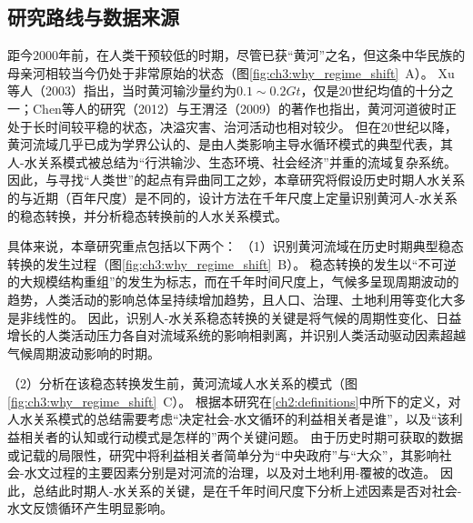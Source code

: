 \subsection{研究路线与数据来源}\label{sec:ch3:method}


距今$2000$年前，在人类干预较低的时期，尽管已获“黄河”之名，但这条中华民族的母亲河相较当今仍处于非常原始的状态（图\ref{fig:ch3:why_regime_shift}~A）。
Xu等人（2003）\cite{xu2003a}指出，当时黄河输沙量约为$0.1\sim0.2 Gt$，仅是20世纪均值的十分之一；Chen等人的研究（2012）\cite{chen2012}与王渭泾（2009）\cite{WangWeiJing2009}的著作也指出，黄河河道彼时正处于长时间较平稳的状态，决溢灾害、治河活动也相对较少。
但在20世纪以降，黄河流域几乎已成为学界公认的、是由人类影响主导水循环模式的典型代表，其人-水关系模式被总结为“行洪输沙、生态环境、社会经济”并重的流域复杂系统\cite{jiang2020b}。
因此，与寻找“人类世”的起点有异曲同工之妙，本章研究将假设历史时期人水关系的与近期（百年尺度）是不同的，设计方法在千年尺度上定量识别黄河人-水关系的稳态转换，并分析稳态转换前的人水关系模式。

具体来说，本章研究重点包括以下两个：
（1）识别黄河流域在历史时期典型稳态转换的发生过程（图\ref{fig:ch3:why_regime_shift}~B）。
稳态转换的发生以“不可逆的大规模结构重组”的发生为标志，而在千年时间尺度上，气候多呈现周期波动的趋势，人类活动的影响总体呈持续增加趋势，且人口、治理、土地利用等变化大多是非线性的\cite{GeQuanSheng2011}。
因此，识别人-水关系稳态转换的关键是将气候的周期性变化、日益增长的人类活动压力各自对流域系统的影响相剥离，并识别人类活动驱动因素超越气候周期波动影响的时期。

（2）分析在该稳态转换发生前，黄河流域人水关系的模式（图\ref{fig:ch3:why_regime_shift}~C）。
根据本研究在\ref{ch2:definitions}中所下的定义，对人水关系模式的总结需要考虑“决定社会-水文循环的利益相关者是谁”，以及“该利益相关者的认知或行动模式是怎样的”两个关键问题。
由于历史时期可获取的数据或记载的局限性，研究中将利益相关者简单分为“中央政府”与“大众”，其影响社会-水文过程的主要因素分别是对河流的治理，以及对土地利用-覆被的改造。
因此，总结此时期人-水关系的关键，是在千年时间尺度下分析上述因素是否对社会-水文反馈循环产生明显影响。

